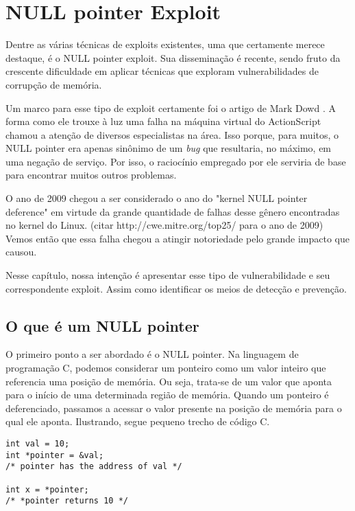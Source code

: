 
\chapter{NULL pointer Exploit}
\label{chap:null_pointer_exploit}

	Dentre as várias técnicas de exploits existentes, uma que certamente merece
	destaque, é o NULL pointer exploit.
	Sua disseminação é recente, sendo fruto da crescente dificuldade em aplicar técnicas
	que exploram vulnerabilidades de corrupção de memória.
	

	Um marco para esse tipo de exploit certamente foi o artigo de Mark Dowd \cite{Dowd2008}.
	A forma como ele trouxe à luz uma falha na máquina virtual do ActionScript chamou
	a atenção de diversos especialistas na área. 
	Isso porque, para muitos, o NULL pointer era apenas sinônimo de um \textsl{bug}
	que resultaria, no máximo, em uma negação de serviço.
	Por isso, o raciocínio empregado por ele serviria de base para encontrar muitos outros problemas.

	
	O ano de 2009 chegou a ser considerado o ano do "kernel NULL pointer deference"
	em virtude da grande quantidade de falhas desse gênero encontradas no kernel do Linux.
	(citar http://cwe.mitre.org/top25/ para o ano de 2009)
	Vemos então que essa falha chegou a atingir notoriedade pelo grande impacto que causou.

	
	Nesse capítulo, nossa intenção é apresentar esse tipo de vulnerabilidade e seu
	correspondente exploit. Assim como identificar os meios de detecção e prevenção. 
	
	
	\section{O que é um NULL pointer}
		O primeiro ponto a ser abordado é o NULL pointer.
		Na linguagem de programação C, podemos considerar um ponteiro como um valor inteiro
		que referencia uma posição de memória. Ou seja, trata-se de um valor que aponta
		para o início de uma determinada região de memória. Quando um ponteiro é deferenciado,
		passamos a acessar o valor presente na posição de memória para o qual ele aponta.
		Ilustrando, segue pequeno trecho de código C.
		\begin{lstlisting}[label=pointer_example,caption=Ponteiro em C]
int val = 10;
int *pointer = &val;
/* pointer has the address of val */

int x = *pointer;
/* *pointer returns 10 */
		\end{lstlisting}
		

